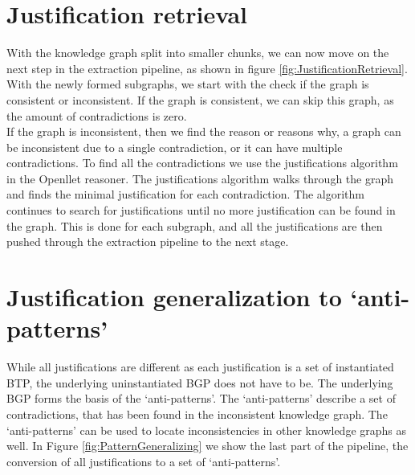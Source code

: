 \documentclass[11pt,letterpaper ,oneside ]{book}
\begin{document}
\section{Justification retrieval}
With the knowledge graph split into smaller chunks, we can now move on the next step in the extraction pipeline, as shown in figure \ref{fig:JustificationRetrieval}.
With the newly formed subgraphs, we start with the check if the graph is consistent or inconsistent. If the graph is consistent, we can skip this graph, as the amount of contradictions is zero.\\ 
If the graph is inconsistent, then we find the reason or reasons why, a graph can be inconsistent due to a single contradiction, or it can have multiple contradictions. 
To find all the contradictions we use the justifications algorithm in the Openllet reasoner. The justifications algorithm walks through the graph and finds the minimal justification for each contradiction. The algorithm continues to search for justifications until no more justification can be found in the graph. This is done for each subgraph, and all the justifications are then pushed through the extraction pipeline to the next stage.\\

\section{Justification generalization to `anti-patterns'}
While all justifications are different as each justification is a set of instantiated BTP, the underlying uninstantiated BGP does not have to be. The underlying BGP forms the basis of the `anti-patterns'. The `anti-patterns' describe a set of contradictions, that has been found in the inconsistent knowledge graph. The `anti-patterns' can be used to locate inconsistencies in other knowledge graphs as well. In Figure \ref{fig:PatternGeneralizing} we show the last part of the pipeline, the conversion of all justifications to a set of `anti-patterns'.
\end{document}
